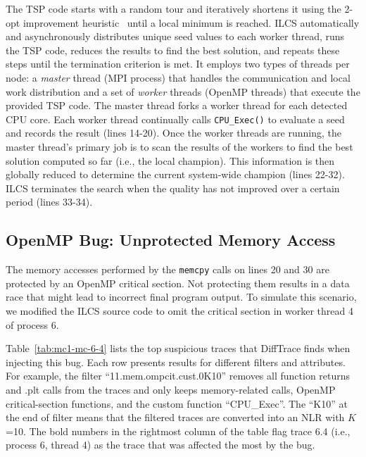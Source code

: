 The TSP code starts with a random tour and iteratively shortens it using the 2-opt improvement heuristic~\cite{2-opt} until a local minimum is reached. ILCS automatically and asynchronously distributes unique seed values to each worker thread, runs the TSP code, reduces the results to find the best solution, and repeats these steps until the termination criterion is met. It employs two types of threads per node: a \textit{master} thread (MPI process) that handles the communication and local work distribution and a set of \textit{worker} threads (OpenMP threads) that execute the provided TSP code. The master thread forks a worker thread for each detected CPU core.
%
Each worker thread continually calls
\texttt{CPU\_Exec()} to evaluate a seed and records the result (lines 14-20).
%
Once the worker threads are running, the master thread's primary job is to scan the results of the workers to find the best solution computed so far (i.e., the local champion). This information is then globally reduced to determine the current system-wide champion (lines 22-32).
%
ILCS terminates the search when the quality has not improved over a certain period (lines 33-34).



\subsection{OpenMP Bug: Unprotected Memory Access}

The memory accesses performed by the \texttt{memcpy} calls on lines 20 and 30 are protected by an OpenMP critical section.
%
Not protecting them results in a data race that might lead to incorrect final program output.
%
To simulate this scenario, we modified the ILCS source code to omit the critical section in worker thread 4 of process 6.

Table~\ref{tab:mc1-mc-6-4} lists the top suspicious traces that DiffTrace finds when injecting this bug.
%
Each row presents results for different filters and attributes.
%
For example, the filter ``11.mem.ompcit.cust.0K10'' removes all function returns and .plt calls from the traces and only keeps memory-related calls, OpenMP critical-section functions, and the custom function ``CPU\_Exec''.
%
The ``K10'' at the end of filter means that the filtered traces are converted into an NLR with $K$=10.
%
%
The bold numbers in the rightmost column of the table flag trace 6.4 (i.e., process 6, thread 4) as the trace that was affected the most by the bug.

